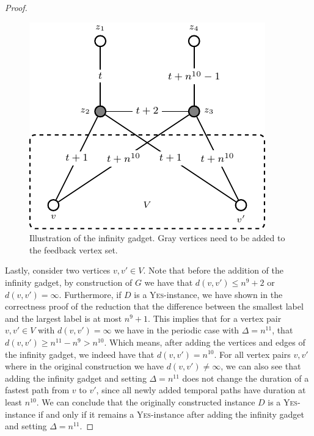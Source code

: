 \documentclass[a4paper,UKenglish,cleveref, autoref, thm-restate]{lipics-v2021}
\begin{document}
\begin{proof}
\begin{figure}[t]
\includegraphics{fig-W1-infinity}
    \caption{Illustration of the infinity gadget. Gray vertices need to be added to the feedback vertex set.}\label{fig:hardness2}
\end{figure}

Lastly, consider two vertices $v,v'\in V$. Note that before the addition of the infinity gadget, by construction of $G$ we have that $d(v,v')\le n^9+2$ or $d(v,v')=\infty$. Furthermore, if $D$ is a \textsc{Yes}-instance, we have shown in the correctness proof of the reduction that the difference between the smallest label and the largest label is at most $n^9+1$. This implies that for a vertex pair $v,v'\in V$ with $d(v,v')=\infty$ we have in the periodic case with $\Delta=n^{11}$, that $d(v,v')\ge n^{11}-n^9>n^{10}$. Which means, after adding the vertices and edges of the infinity gadget, we indeed have that $d(v,v')=n^{10}$. For all vertex pairs $v,v'$ where in the original construction we have $d(v,v')\neq\infty$, we can also see that adding the infinity gadget and setting $\Delta=n^{11}$ does not change the duration of a fastest path from $v$ to $v'$, since all newly added temporal paths have duration at least $n^{10}$. We can conclude that the originally constructed instance $D$ is a \textsc{Yes}-instance if and only if it remains a \textsc{Yes}-instance after adding the infinity gadget and setting $\Delta=n^{11}$.
\end{proof}
\end{document}
